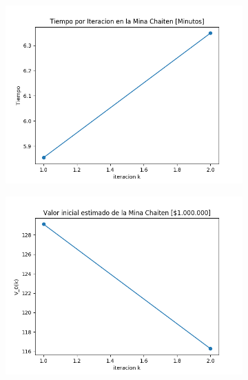 \documentclass[12pt,letterpaper]{article}
\begin{document}
\begin{figure}[H]
  \begin{subfigure}[b]{0.4\textwidth}
     \includegraphics[width=\textwidth]{Graficos/sin_filtrar/libre/chaiten_inc_times.png}
     \caption{}
     \label{fig:ex1}
  \end{subfigure}
  \begin{subfigure}[b]{0.4\textwidth}
     \includegraphics[width=\textwidth]{Graficos/sin_filtrar/libre/chaiten_inc_v_k.png}
     \caption{}
     \label{fig:ex2}
  \end{subfigure}
\end{figure}
\end{document}
